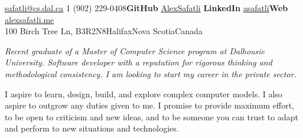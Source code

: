 \documentclass[10pt,a4paper]{article}
\begin{document}
 

\noindent\href{mailto:safatli@cs.dal.ca}{safatli@cs.dal.ca}\bull
\textsmaller{+}1 (902) 229-0408\bull \textbf{GitHub} \href{https://github.com/AlexSafatli/}{AlexSafatli}\bull
\textbf{LinkedIn} \href{http://ca.linkedin.com/in/asafatli}{asafatli}\bull \textbf{Web} \href{http://alexsafatli.me}{alexsafatli.me}\\
100 Birch Tree Ln, B3R2N8\bull Halifax\bull Nova Scotia\bull Canada
\spacedhrule{0.9em}{-0.4em} %

\vspace{-1.3em}
\begin{multicols}{2}
\noindent \textit{Recent graduate of a Master of Computer Science program at Dalhousie University. Software developer with a reputation for rigorous thinking and methodological consistency. I am looking to start my career in the private sector.}

I aspire to learn, design, build, and explore complex computer models. I also aspire to outgrow any duties given to me. I promise to provide maximum effort, to be open to criticism and new ideas, and to be someone you can trust to adapt and perform to new situations and technologies.
\end{multicols}
\spacedhrule{0.5em}{-0.4em} %
\end{document}
